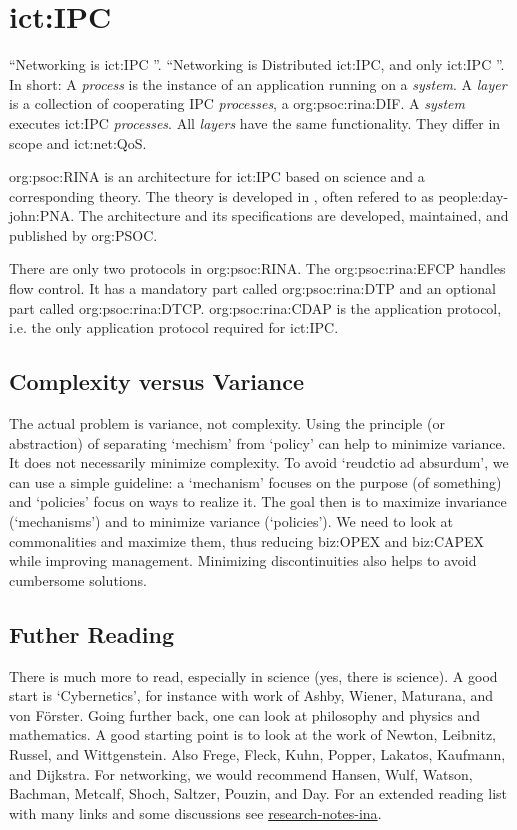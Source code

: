 \section{\acl{ict:IPC}}
\label{sec:ipc}


``Networking is \ac{ict:IPC} ''.
``Networking is Distributed \ac{ict:IPC}, and only \ac{ict:IPC} ''.
In short: A \textit{process} is the instance of an application running on a \textit{system}.
A \textit{layer} is a collection of cooperating IPC \textit{processes}, a \ac{org:psoc:rina:DIF}.
A \textit{system} executes \ac{ict:IPC} \textit{processes}.
All \textit{layers} have the same functionality.
They differ in scope and \ac{ict:net:QoS}.

\acs{org:psoc:RINA} is an architecture for \ac{ict:IPC} based on science and a corresponding theory.
The theory is developed in , often refered to as \ac{people:day-john:PNA}.
The architecture and its specifications are developed, maintained, and published by \ac{org:PSOC}.

There are only two protocols in \acs{org:psoc:RINA}.
The \ac{org:psoc:rina:EFCP} handles flow control.
It has a mandatory part called \ac{org:psoc:rina:DTP} and an optional part called \ac{org:psoc:rina:DTCP}.
\ac{org:psoc:rina:CDAP} is the application protocol, i.e. the only application protocol required for \ac{ict:IPC}.


\subsection{Complexity versus Variance}

The actual problem is variance, not complexity.
Using the principle (or abstraction) of separating `mechism' from `policy' can help to minimize variance.
It does not necessarily minimize complexity.
To avoid `reudctio ad absurdum', we can use a simple guideline:
a `mechanism' focuses on the purpose (of something) and `policies' focus on ways to realize it.
The goal then is to maximize invariance (`mechanisms') and to minimize variance (`policies').
We need to look at commonalities and maximize them, thus reducing \acs{biz:OPEX} and \acs{biz:CAPEX} while improving management.
Minimizing discontinuities also helps to avoid cumbersome solutions.


\subsection{Futher Reading}

There is much more to read, especially in science (yes, there is science).
A good start is `Cybernetics', for instance with work of Ashby, Wiener, Maturana, and von Förster.
Going further back, one can look at philosophy and physics and mathematics.
A good starting point is to look at the work of Newton, Leibnitz, Russel, and Wittgenstein.
Also Frege, Fleck, Kuhn, Popper, Lakatos, Kaufmann, and Dijkstra.
For networking, we would recommend Hansen, Wulf, Watson, Bachman, Metcalf, Shoch, Saltzer, Pouzin, and Day.
For an extended reading list with many links and some discussions see
    \href{https://vdmeer.github.io/skb/research-notes-ina.html}{research-notes-ina}.
